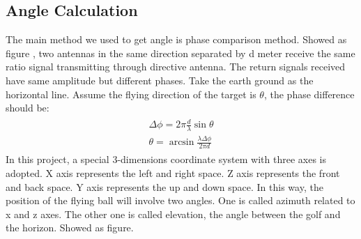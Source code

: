 \subsection{Angle Calculation}
The main method we used to get angle is phase comparison method. Showed as figure , two antennas in the same direction separated by d meter receive the same ratio signal transmitting through directive antenna. The return signals received have same amplitude but different phases. Take the earth ground as the horizontal line. Assume the flying direction of the target is $\theta$, the phase difference should be:
\begin{align}
\begin{split}
\Delta \phi=2 \pi \frac{d}{\lambda} \sin \theta\\
\theta=\arcsin \frac{\lambda \Delta \phi}{2 \pi d}
\end{split}
\end{align}
In this project, a special 3-dimensions coordinate system with three axes is adopted. X axis represents the left and right space. Z axis represents the front and back space. Y axis represents the up and down space. In this way, the position of the flying ball will involve two angles. One is called azimuth related to x and z axes. The other one is called elevation, the angle between the golf and the horizon. Showed as figure.


